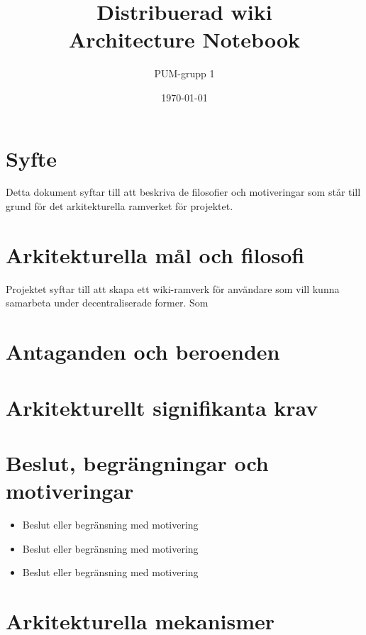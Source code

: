 

\ifpdf
\else
\fi

\title{Distribuerad wiki \\ Architecture Notebook}
\author{PUM-grupp 1}
\date{\today}



\maketitle

\thispagestyle{empty}
\newpage
\section{Syfte}
Detta dokument syftar till att beskriva de filosofier och motiveringar som står till grund för det arkitekturella ramverket för projektet.
\section{Arkitekturella mål och filosofi}
Projektet syftar till att skapa ett wiki-ramverk för användare som vill kunna samarbeta under decentraliserade former. Som 
\section{Antaganden och beroenden}
\section{Arkitekturellt signifikanta krav}
\section{Beslut, begrängningar och motiveringar}
\begin{itemize}
\item Beslut eller begränsning med motivering
\item Beslut eller begränsning med motivering
\item Beslut eller begränsning med motivering
\end{itemize}

\section{Arkitekturella mekanismer}
